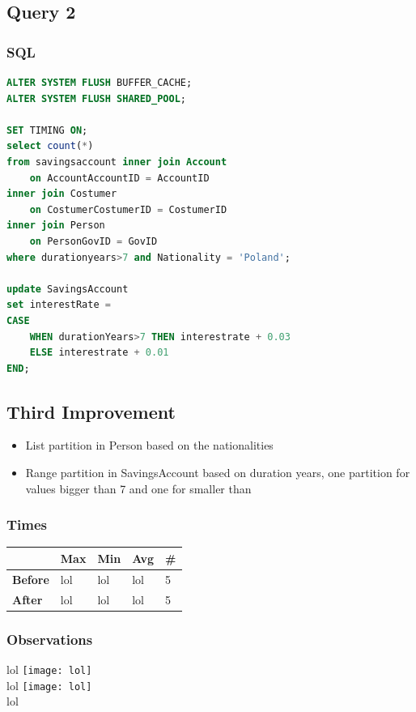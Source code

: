 \documentclass[a4paper, 10pt]{article}
\begin{document}
\subsection{Query 2}
\subsubsection{SQL}
\begin{lstlisting}[language=SQL]
ALTER SYSTEM FLUSH BUFFER_CACHE;
ALTER SYSTEM FLUSH SHARED_POOL;

SET TIMING ON;
select count(*)
from savingsaccount inner join Account
    on AccountAccountID = AccountID
inner join Costumer
    on CostumerCostumerID = CostumerID
inner join Person
    on PersonGovID = GovID
where durationyears>7 and Nationality = 'Poland';

update SavingsAccount
set interestRate =
CASE
    WHEN durationYears>7 THEN interestrate + 0.03
    ELSE interestrate + 0.01
END;
\end{lstlisting}

\subsection{Third Improvement}
\begin{itemize}
  \item List partition in Person based on the nationalities
  \item Range partition in SavingsAccount based on duration years, one partition for values bigger than 7 and one for smaller than
\end{itemize}
\subsubsection{Times}
\begin{table}[H]
\begin{tabular}{l|l|l|l|l|}
\cline{2-5}
\textbf{}                             & \textbf{Max} & \textbf{Min} & \textbf{Avg} & \textbf{\#}  \\ \hline
\multicolumn{1}{|l|}{\textbf{Before}} & lol         & lol         & lol          & 5            \\ \hline
\multicolumn{1}{|l|}{\textbf{After}}  & lol         & lol         & lol          & 5            \\ \hline
\end{tabular}
\end{table}
\subsubsection{Observations}
lol
\texttt{[image: lol]}\\ 
lol
\texttt{[image: lol]}\\
lol
\end{document}
